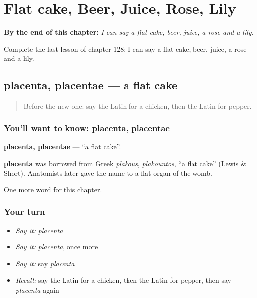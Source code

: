 
\chapter{Flat cake, Beer, Juice, Rose, Lily}
\label{ch:la-flat-cake-beer-juice-rose-lily}

\begin{chapteropening}
\textbf{By the end of this chapter:} \emph{I can say a flat cake, beer, juice, a rose and a lily.}

Complete the last lesson of chapter 128: I can say a flat cake, beer, juice, a rose and a lily.
\end{chapteropening}

\section[placenta, placentae]{placenta, placentae — a flat cake}

\label{lesson:LA-C128-placenta}



\begin{quote}
Before the new one: say the Latin for a chicken, then the Latin for pepper.
\end{quote}

\subsection*{You'll want to know: placenta, placentae}
\textbf{placenta, placentae} — \textquotedblleft{}a flat cake\textquotedblright{}.

\begin{cousinweb}
\textbf{placenta} was borrowed from Greek \emph{plakous}, \emph{plakountos}, \textquotedblleft{}a flat cake\textquotedblright{} (Lewis \& Short). Anatomists later gave the name to a flat organ of the womb.
\end{cousinweb}

\begin{grammarlens}[title={What you've built}]
One more word for this chapter.
\end{grammarlens}

\subsection*{Your turn}
\begin{itemize}
\raggedright
  \item \emph{Say it:} \emph{placenta}
  \item \emph{Say it:} \emph{placenta}, once more
  \item \emph{Say it:} say \emph{placenta}
  \item \emph{Recall:} say the Latin for a chicken, then the Latin for pepper, then say \emph{placenta} again
\end{itemize}

